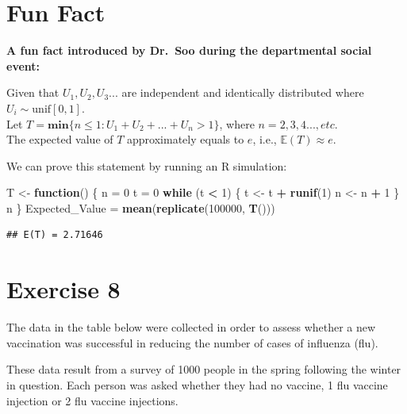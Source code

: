 \documentclass[
]{book}
\newenvironment{Shaded}{\begin{snugshade}}{\end{snugshade}}
\newcommand{\ControlFlowTok}[1]{\textcolor[rgb]{0.13,0.29,0.53}{\textbf{#1}}}
\newcommand{\DecValTok}[1]{\textcolor[rgb]{0.00,0.00,0.81}{#1}}
\newcommand{\FunctionTok}[1]{\textcolor[rgb]{0.13,0.29,0.53}{\textbf{#1}}}
\newcommand{\NormalTok}[1]{#1}
\newcommand{\OtherTok}[1]{\textcolor[rgb]{0.56,0.35,0.01}{#1}}
\newcommand{\SpecialCharTok}[1]{\textcolor[rgb]{0.81,0.36,0.00}{\textbf{#1}}}
\begin{document}
\chapter{Fun Fact}\label{fun-fact}

\textbf{A fun fact introduced by Dr.~Soo during the departmental social event:}

Given that \(U_1, U_2, U_3...\) are independent and identically distributed where \(U_i \sim \text{unif}[0,1]\).\\
Let \(T = \textbf{min}\{n \leq 1: U_1 + U_2 + ... + U_n > 1\}\), where \(n = 2, 3, 4..., etc\).\\
The expected value of \(T\) approximately equals to \(e\), i.e., \(\mathbb{E}(T) \approx e\).

We can prove this statement by running an R simulation:

\begin{Shaded}
\begin{Highlighting}[]
\NormalTok{T }\OtherTok{\textless{}{-}} \ControlFlowTok{function}\NormalTok{() \{}
\NormalTok{  n }\OtherTok{=} \DecValTok{0}
\NormalTok{  t }\OtherTok{=} \DecValTok{0}
  \ControlFlowTok{while}\NormalTok{ (t }\SpecialCharTok{\textless{}} \DecValTok{1}\NormalTok{) \{}
\NormalTok{    t }\OtherTok{\textless{}{-}}\NormalTok{ t }\SpecialCharTok{+} \FunctionTok{runif}\NormalTok{(}\DecValTok{1}\NormalTok{)}
\NormalTok{    n }\OtherTok{\textless{}{-}}\NormalTok{ n }\SpecialCharTok{+} \DecValTok{1}
\NormalTok{  \}}
\NormalTok{  n}
\NormalTok{\}}
\NormalTok{Expected\_Value }\OtherTok{=} \FunctionTok{mean}\NormalTok{(}\FunctionTok{replicate}\NormalTok{(}\DecValTok{100000}\NormalTok{, }\FunctionTok{T}\NormalTok{()))}
\end{Highlighting}
\end{Shaded}

\begin{verbatim}
## E(T) = 2.71646
\end{verbatim}

\chapter{Exercise 8}\label{exercise-8}

The data in the table below were collected in order to assess whether a new vaccination was
successful in reducing the number of cases of influenza (flu).

These data result from a survey of 1000 people in the spring following the winter in question. Each
person was asked whether they had no vaccine, 1 flu vaccine injection or 2 flu vaccine injections.
\end{document}
